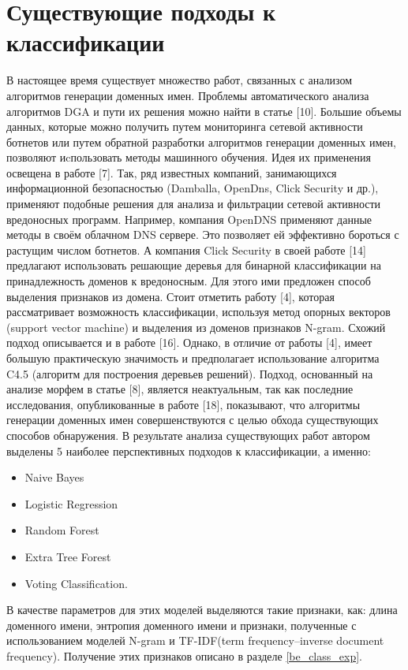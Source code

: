 \section{Существующие подходы к классификации}\label{be_class}
В настоящее время существует множество работ, связанных с анализом алгоритмов генерации доменных имен. Проблемы автоматического анализа алгоритмов DGA и пути их решения можно найти в статье [10]. Большие объемы данных, которые можно получить путем мониторинга сетевой активности ботнетов или путем обратной разработки алгоритмов генерации доменных имен, позволяют иcпользовать методы машинного обучения. Идея их применения освещена в работе [7]. Так, ряд известных компаний, занимающихся информационной безопасностью (Damballa, OpenDns, Click Security и др.), применяют подобные решения для анализа и фильтрации сетевой активности вредоносных программ. Например, компания OpenDNS применяют данные методы в своём облачном DNS сервере. Это позволяет ей эффективно бороться с растущим числом ботнетов. А компания Click Security в своей работе [14] предлагают использовать решающие деревья для бинарной классификации на принадлежность доменов к вредоносным. Для этого ими предложен способ выделения признаков из домена. Стоит отметить работу [4], которая рассматривает возможность классификации, используя метод опорных векторов (support vector machine) и выделения из доменов признаков N-gram. Схожий подход описывается и в работе [16]. Однако, в отличие от работы [4], имеет большую практическую значимость и предполагает использование алгоритма C4.5 (алгоритм для построения деревьев решений). Подход, основанный на анализе морфем в статье [8], является неактуальным, так как последние исследования, опубликованные в работе [18], показывают, что алгоритмы генерации доменных имен совершенствуются с целью обхода существующих способов обнаружения. В результате анализа существующих работ автором выделены 5 наиболее перспективных подходов к классификации, а именно:
\begin{itemize}
\item Naive Bayes
\item Logistic Regression
\item Random Forest
\item Extra Tree Forest
\item Voting Classification.
\end{itemize}

В качестве параметров для этих моделей выделяются такие признаки, как: длина доменного имени, энтропия доменного имени и признаки, полученные с использованием моделей N-gram и TF-IDF(term frequency–inverse document frequency).
Получение этих признаков описано в разделе \ref{be_class_exp}.
\clearpage


